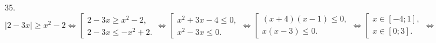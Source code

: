35. $|2-3x|\geqslant x^2-2\Leftrightarrow\left[\begin{array}{l}2-3x\geqslant x^2-2,\\ 2-3x\leqslant -x^2+2.\end{array}\right.\Leftrightarrow
\left[\begin{array}{l}x^2+3x-4\leqslant 0,\\ x^2-3x\leqslant 0.\end{array}\right.\Leftrightarrow
\left[\begin{array}{l}(x+4)(x-1)\leqslant 0,\\ x(x-3)\leqslant 0.\end{array}\right.
\Leftrightarrow
\left[\begin{array}{l}x\in[-4;1],\\ x\in[0;3].\end{array}\right.\Leftrightarrow
x\in[-4;3].$\\
